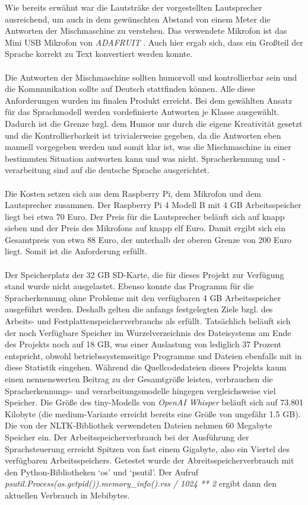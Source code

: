 Wie bereits erwähnt war die Lautsträke der vorgestellten Lautsprecher ausreichend, um auch in dem gewünschten Abstand von einem Meter die Antworten der Mischmaschine zu verstehen. Das verwendete Mikrofon ist das Mini USB Mikrofon von \textit{ADAFRUIT} \cite{industries_mini_nodate}. Auch hier ergab sich, dass ein Großteil der Sprache korrekt zu Text konvertiert werden konnte.\\\\
Die Antworten der Mischmaschine sollten humorvoll und kontrollierbar sein und die Kommunikation sollte auf Deutsch stattfinden können. Alle diese Anforderungen wurden im finalen Produkt erreicht. Bei dem gewählten Ansatz für das Sprachmodell werden vordefinierte Antworten je Klasse ausgewählt. Dadurch ist die Grenze bzgl. dem Humor nur durch die eigene Kreativität gesetzt und die Kontrollierbarkeit ist trivialerweise gegeben, da die Antworten eben manuell vorgegeben werden und somit klar ist, was die Mischmaschine in einer bestimmten Situation antworten kann und was nicht. Spracherkennung und -verarbeitung sind auf die deutsche Sprache ausgerichtet.\\\\
Die Kosten setzen sich aus dem Raspberry Pi, dem Mikrofon und dem Lautsprecher zusammen. Der Raspberry Pi 4 Modell B mit 4 \ac{GB} Arbeitsspeicher liegt bei etwa 70 Euro. Der Preis für die Lautsprecher beläuft sich auf knapp sieben und der Preis des Mikrofons auf knapp elf Euro. Damit ergibt sich ein Gesamtpreis von etwa 88 Euro, der unterhalb der oberen Grenze von 200 Euro liegt. Somit ist die Anforderung erfüllt.\\\\
Der Speicherplatz der 32 \ac{GB} SD-Karte, die für dieses Projekt zur Verfügung stand wurde nicht ausgelastet. Ebenso konnte das Programm für die Spracherkennung ohne Probleme mit den verfügbaren 4 \ac{GB} Arbeitsspeicher ausgeführt werden. Deshalb gelten die anfangs festgelegten Ziele bzgl. des Arbeits- und Festplattenspeicherverbrauchs als erfüllt. Tatsächlich beläuft sich der noch Verfügbare Speicher im Wurzelverzeichnis des Dateisystems am Ende des Projekts noch auf 18 \ac{GB}, was einer Auslastung von lediglich 37 Prozent entspricht, obwohl betriebssystemseitige Programme und Dateien ebenfalls mit in diese Statistik eingehen. Während die Quellcodedateien dieses Projekts kaum einen nennenswerten Beitrag zu der Gesamtgröße leisten, verbrauchen die Spracherkennungs- und verarbeitungsmodelle hingegen vergleichsweise viel Speicher. Die Größe des \glqq{}tiny\grqq{}-Modells von \textit{OpenAI Whisper} beläuft sich auf 73.801 Kilobyte (die \glqq{}medium\grqq{}-Variante erreicht bereits eine Größe von ungefähr 1.5 \ac{GB}). Die von der \ac{NLTK}-Bibliothek verwendeten Dateien nehmen 60 Megabyte Speicher ein. Der Arbeitsspeicherverbrauch bei der Ausführung der Sprachsteuerung erreicht Spitzen von fast einem Gigabyte, also ein Viertel des verfügbaren Arbeitsspeichers. Getestet wurde der Abreitsspeicherverbrauch mit den Python-Bibliotheken `os' und `psutil'. Der Aufruf \textit{psutil.Process(os.getpid()).memory\_info().rss / 1024 ** 2} ergibt dann den aktuellen Verbrauch in Mebibytes.\\\\
